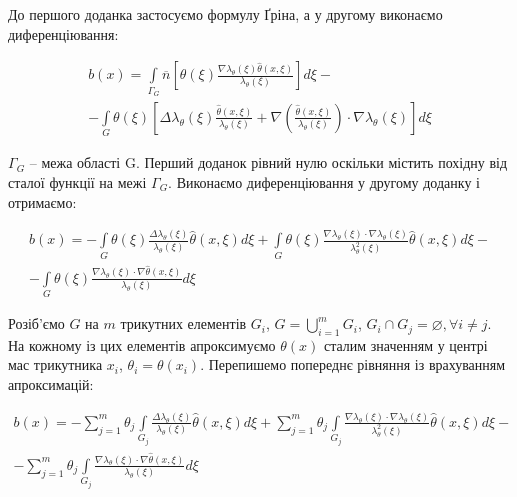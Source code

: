 \noindent До першого доданка застосуємо формулу Ґріна, а у другому виконаємо диференціювання:

\begin{equation}
    \begin{split}
        b(x) =  \int \limits_{\Gamma_G} \overline{n} 
            \left[ \theta(\xi) \frac{\nabla \lambda_\theta(\xi) \hat{\theta}(x, \xi)}{\lambda_\theta(\xi)} 
                \right] d \xi - \\
            -
            \int \limits_{G} \theta(\xi) \left[
                \Delta \lambda_{\theta}(\xi) \frac{\hat{\theta}(x, \xi)}{\lambda_{\theta}(\xi)} +
                \nabla \left(\frac{\hat{\theta}(x, \xi)}{\lambda_{\theta}(\xi)}\right) 
                    \cdot \nabla \lambda_{\theta}(\xi) \right] d \xi 
    \end{split}
\end{equation}

\noindent $\Gamma_G$ -- межа області G. Перший доданок рівний нулю оскільки містить похідну від сталої функції на межі 
$\Gamma_G$. Виконаємо диференціювання у другому доданку і отримаємо:

\begin{equation}
    \begin{split}
        b(x) =  - \int \limits_{G} \theta(\xi) \frac{\Delta \lambda_{\theta}(\xi)}{\lambda_{\theta}(\xi)} 
            \hat{\theta}(x, \xi) d \xi +
            \int \limits_{G} \theta(\xi) \frac{\nabla \lambda_{\theta}(\xi) \cdot \nabla \lambda_{\theta}(\xi)}
                {\lambda_{\theta}^2(\xi)}\hat{\theta}(x, \xi) d \xi - \\
            -  
            \int \limits_{G} \theta(\xi) \frac{\nabla \lambda_{\theta}(\xi) \cdot \nabla \hat{\theta}(x, \xi)}
                {\lambda_{\theta}(\xi)} d \xi
    \end{split}
\end{equation}

\noindent Розіб'ємо $G$ на $m$ трикутних елементів $G_i$, 
$G = \bigcup_{i=1}^m G_i$, $G_i \cap G_j = \varnothing, \forall i \neq j$. На кожному із цих елементів апроксимуємо 
$\theta(x)$ сталим значенням у центрі мас трикутника $x_i$, $\theta_i = \theta(x_i)$. Перепишемо попереднє рівняння із
врахуванням апроксимацій:

\begin{equation}
    \begin{split}
        b(x) =  - \sum_{j=1}^{m} \theta_j \int \limits_{G_j} \frac{\Delta \lambda_{\theta}(\xi)}{\lambda_{\theta}(\xi)} 
            \hat{\theta}(x, \xi) d \xi +
            \sum_{j=1}^{m} \theta_j \int \limits_{G_j} \frac{\nabla \lambda_{\theta}(\xi) \cdot \nabla 
                \lambda_{\theta}(\xi)} {\lambda_{\theta}^2(\xi)}\hat{\theta}(x, \xi) d \xi - \\
            -  
            \sum_{j=1}^{m} \theta_j \int \limits_{G_j} \frac{\nabla \lambda_{\theta}(\xi) \cdot \nabla 
                \hat{\theta}(x, \xi)} {\lambda_{\theta}(\xi)} d \xi
    \end{split}
\end{equation}

